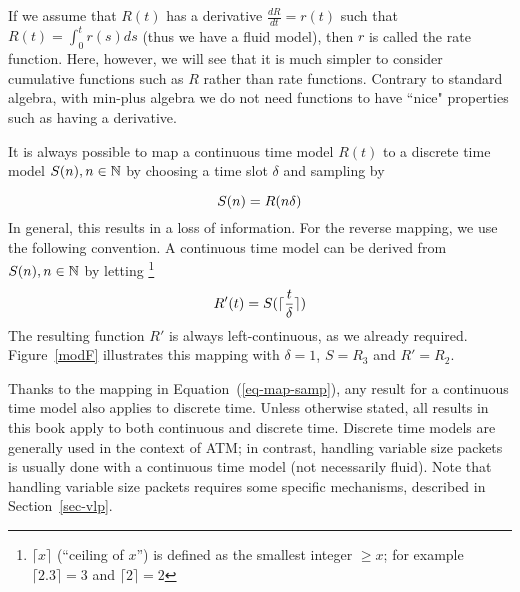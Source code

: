 \begin{figure}[htbp]
\end{figure}

If we assume that $R(t)$ has a derivative $\frac{dR}{dt}=r(t)$
such that $R(t)=\int_{0}^t r(s) ds$ (thus we have a fluid model),
then $r$ is called the rate function. Here, however, we will see
that it is much simpler to consider cumulative functions such as
$R$ rather than rate functions. Contrary to standard algebra, with
min-plus algebra we do not need functions to have ``nice"
properties such as having a derivative.

It is always possible to map a continuous time model $R(t)$ to a
discrete time model $S(n), n \in \mathbb{N}$ by choosing a time slot
$\delta$ and sampling by

\begin{equation} \mylabel{eq-map-samp}
  S(n) = R( n \delta)
\end{equation}
In general, this results in a loss of information. For the reverse
mapping, we use the following convention. A continuous time model
can be derived from
$S(n), n \in \mathbb{N}$ by letting%
\footnote{$\lceil x \rceil$ (``ceiling of $x$'')
is defined as the smallest integer $\geq x$;
for example $\lceil 2.3\rceil = 3$ and
$\lceil 2\rceil = 2$}%
\begin{equation} \mylabel{eq-map-inter}
 R'(t)= S(\lceil
\frac{t}{\delta}\rceil)
\end{equation}
The resulting function $R'$ is
always left-continuous, as we already required. Figure~\ref{modF} illustrates this
mapping with $\delta = 1$, $S=R_3$ and $R'=R_2$.

Thanks to the mapping in Equation~(\ref{eq-map-samp}), any result
for a continuous time model also applies to discrete time. Unless
otherwise stated, all results in this book apply to both
continuous and discrete time. Discrete time models are generally
used in the context of ATM; in contrast, handling variable size
packets is usually done with a continuous time model (not
necessarily fluid). Note that handling variable size packets
requires some specific mechanisms, described in
Section~\ref{sec-vlp}.

